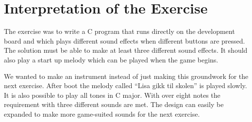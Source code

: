 \section{Interpretation of the Exercise}
The exercise was to write a C program that runs directly on the development board and which plays different sound effects when different buttons are pressed. The solution must be able to make at least three different sound effects. It should also play a start up melody which can be played when the game begins.

We wanted to make an instrument instead of just making this groundwork for the next exercise. After boot the melody called “Lisa gikk til skolen” is played slowly. It is also possible to play all tones in C major. With over eight notes the requirement with three different sounds are met. The design can easily be expanded to make more game-suited sounds for the next exercise. 
